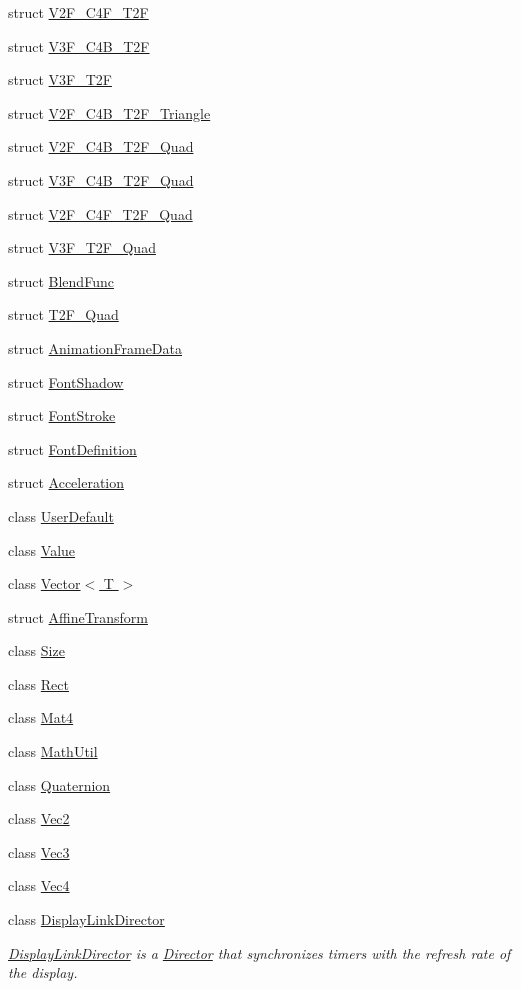 \begin{DoxyCompactItemize}
\item 
struct \hyperlink{structV2F__C4F__T2F}{V2\+F\+\_\+\+C4\+F\+\_\+\+T2F}
\item 
struct \hyperlink{structV3F__C4B__T2F}{V3\+F\+\_\+\+C4\+B\+\_\+\+T2F}
\item 
struct \hyperlink{structV3F__T2F}{V3\+F\+\_\+\+T2F}
\item 
struct \hyperlink{structV2F__C4B__T2F__Triangle}{V2\+F\+\_\+\+C4\+B\+\_\+\+T2\+F\+\_\+\+Triangle}
\item 
struct \hyperlink{structV2F__C4B__T2F__Quad}{V2\+F\+\_\+\+C4\+B\+\_\+\+T2\+F\+\_\+\+Quad}
\item 
struct \hyperlink{structV3F__C4B__T2F__Quad}{V3\+F\+\_\+\+C4\+B\+\_\+\+T2\+F\+\_\+\+Quad}
\item 
struct \hyperlink{structV2F__C4F__T2F__Quad}{V2\+F\+\_\+\+C4\+F\+\_\+\+T2\+F\+\_\+\+Quad}
\item 
struct \hyperlink{structV3F__T2F__Quad}{V3\+F\+\_\+\+T2\+F\+\_\+\+Quad}
\item 
struct \hyperlink{structBlendFunc}{Blend\+Func}
\item 
struct \hyperlink{structT2F__Quad}{T2\+F\+\_\+\+Quad}
\item 
struct \hyperlink{structAnimationFrameData}{Animation\+Frame\+Data}
\item 
struct \hyperlink{structFontShadow}{Font\+Shadow}
\item 
struct \hyperlink{structFontStroke}{Font\+Stroke}
\item 
struct \hyperlink{structFontDefinition}{Font\+Definition}
\item 
struct \hyperlink{classAcceleration}{Acceleration}
\item 
class \hyperlink{classUserDefault}{User\+Default}
\item 
class \hyperlink{classValue}{Value}
\item 
class \hyperlink{classVector}{Vector$<$ T $>$}
\item 
struct \hyperlink{structAffineTransform}{Affine\+Transform}
\item 
class \hyperlink{classSize}{Size}
\item 
class \hyperlink{classRect}{Rect}
\item 
class \hyperlink{classMat4}{Mat4}
\item 
class \hyperlink{classMathUtil}{Math\+Util}
\item 
class \hyperlink{classQuaternion}{Quaternion}
\item 
class \hyperlink{classVec2}{Vec2}
\item 
class \hyperlink{classVec3}{Vec3}
\item 
class \hyperlink{classVec4}{Vec4}
\item 
class \hyperlink{classDisplayLinkDirector}{Display\+Link\+Director}
\begin{DoxyCompactList}\small\item\em \hyperlink{classDisplayLinkDirector}{Display\+Link\+Director} is a \hyperlink{classDirector}{Director} that synchronizes timers with the refresh rate of the display. \end{DoxyCompactList}\end{DoxyCompactItemize}
